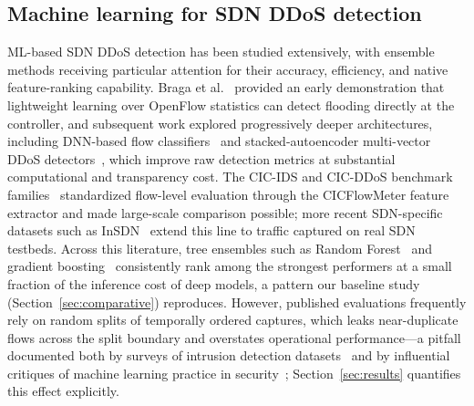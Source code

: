 ﻿\documentclass[review,12pt]{elsarticle}
\begin{document}
\subsection{Machine learning for SDN DDoS detection}
ML-based SDN DDoS detection has been studied extensively, with ensemble methods receiving particular attention for their accuracy, efficiency, and native feature-ranking capability. Braga et al.~\cite{braga2010lightweight} provided an early demonstration that lightweight learning over OpenFlow statistics can detect flooding directly at the controller, and subsequent work explored progressively deeper architectures, including DNN-based flow classifiers~\cite{tang2016deep} and stacked-autoencoder multi-vector DDoS detectors~\cite{niyaz2017deep}, which improve raw detection metrics at substantial computational and transparency cost. The CIC-IDS and CIC-DDoS benchmark families~\cite{sharafaldin2018cicids,sharafaldin2019ddos} standardized flow-level evaluation through the CICFlowMeter feature extractor and made large-scale comparison possible; more recent SDN-specific datasets such as InSDN~\cite{elsayed2020insdn} extend this line to traffic captured on real SDN testbeds. Across this literature, tree ensembles such as Random Forest~\cite{breiman2001rf} and gradient boosting~\cite{chen2016xgboost} consistently rank among the strongest performers at a small fraction of the inference cost of deep models, a pattern our baseline study (Section~\ref{sec:comparative}) reproduces. However, published evaluations frequently rely on random splits of temporally ordered captures, which leaks near-duplicate flows across the split boundary and overstates operational performance---a pitfall documented both by surveys of intrusion detection datasets~\cite{ring2019survey} and by influential critiques of machine learning practice in security~\cite{sommer2010outside,arp2022dos}; Section~\ref{sec:results} quantifies this effect explicitly.
\end{document}
